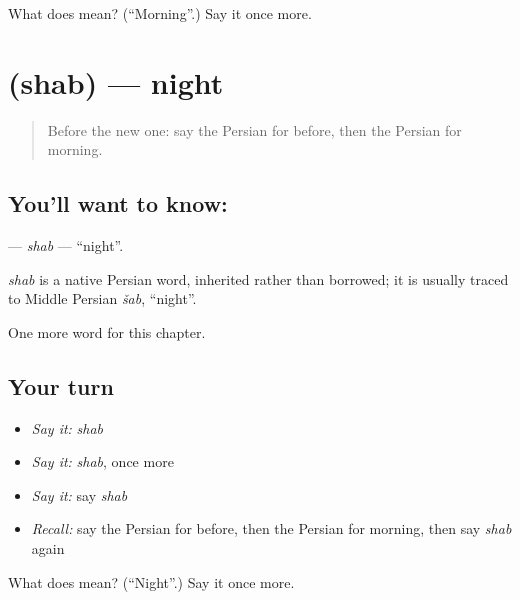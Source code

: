 \begin{tcolorbox}[breakable,colback=teal!4,colframe=teal!35!black,title={Before you move on}]
What does  mean? (\textquotedblleft{}Morning\textquotedblright{}.) Say it once more.
\end{tcolorbox}
\section[\texorpdfstring{\fa{شب} (shab)}{شب (shab)}]{ (shab) — night}

\label{lesson:FA-C67-shab}



\begin{quote}
Before the new one: say the Persian for before, then the Persian for morning.
\end{quote}

\subsection*{You'll want to know: }
\textbf{} — \emph{shab} — \textquotedblleft{}night\textquotedblright{}.

\begin{cousinweb}
\emph{shab} is a native Persian word, inherited rather than borrowed; it is usually traced to Middle Persian \emph{šab}, \textquotedblleft{}night\textquotedblright{}.
\end{cousinweb}

\begin{grammarlens}[title={What you've built}]
One more word for this chapter.
\end{grammarlens}

\subsection*{Your turn}
\begin{itemize}
\raggedright
  \item \emph{Say it:} \emph{shab}
  \item \emph{Say it:} \emph{shab}, once more
  \item \emph{Say it:} say \emph{shab}
  \item \emph{Recall:} say the Persian for before, then the Persian for morning, then say \emph{shab} again
\end{itemize}

\begin{tcolorbox}[breakable,colback=teal!4,colframe=teal!35!black,title={Before you move on}]
What does  mean? (\textquotedblleft{}Night\textquotedblright{}.) Say it once more.
\end{tcolorbox}
